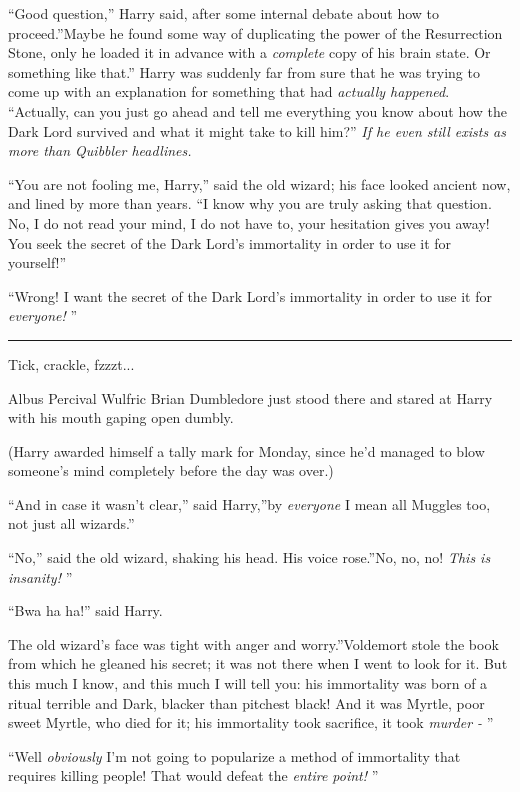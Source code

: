 ``Good question,'' Harry said, after some internal debate about how to
proceed.''Maybe he found some way of duplicating the power of the
Resurrection Stone, only he loaded it in advance with a \emph{complete}
copy of his brain state. Or something like that.'' Harry was suddenly
far from sure that he was trying to come up with an explanation for
something that had \emph{actually happened}. ``Actually, can you just go
ahead and tell me everything you know about how the Dark Lord survived
and what it might take to kill him?'' \emph{If he even still exists as
more than Quibbler headlines.}

``You are not fooling me, Harry,'' said the old wizard; his face looked
ancient now, and lined by more than years. ``I know why you are truly
asking that question. No, I do not read your mind, I do not have to,
your hesitation gives you away! You seek the secret of the Dark Lord's
immortality in order to use it for yourself!''

``Wrong! I want the secret of the Dark Lord's immortality in order to use
it for \emph{everyone!} ''

\begin{center}\rule{3in}{0.4pt}\end{center}

Tick, crackle, fzzzt...

Albus Percival Wulfric Brian Dumbledore just stood there and stared at
Harry with his mouth gaping open dumbly.

(Harry awarded himself a tally mark for Monday, since he'd managed to
blow someone's mind completely before the day was over.)

``And in case it wasn't clear,'' said Harry,''by \emph{everyone} I mean
all Muggles too, not just all wizards.''

``No,'' said the old wizard, shaking his head. His voice rose.''No, no,
no! \emph{This is insanity!} ''

``Bwa ha ha!'' said Harry.

The old wizard's face was tight with anger and worry.''Voldemort stole
the book from which he gleaned his secret; it was not there when I went
to look for it. But this much I know, and this much I will tell you: his
immortality was born of a ritual terrible and Dark, blacker than
pitchest black! And it was Myrtle, poor sweet Myrtle, who died for it;
his immortality took sacrifice, it took \emph{murder -} ''

``Well \emph{obviously} I'm not going to popularize a method of
immortality that requires killing people! That would defeat the
\emph{entire point!} ''

